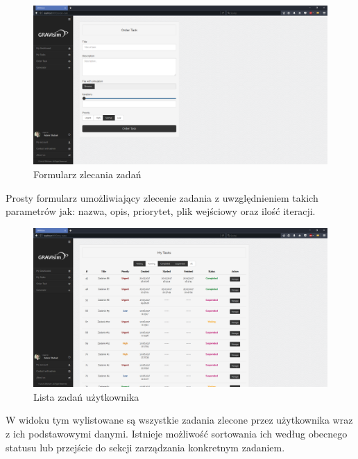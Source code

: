 \documentclass[a4paper,onecolumn,oneside,12pt]{memoir}
\begin{document}
{{\begin{figure}[h!]
	\centering
	\includegraphics[width=0.9\linewidth]{pictures/screen-4}
	\caption{Formularz zlecania zadań}
\end{figure}
Prosty formularz umożliwiający zlecenie zadania z uwzględnieniem takich parametrów jak: nazwa, opis, priorytet, plik wejściowy oraz ilość iteracji.

\begin{figure}[h!]
	\centering
	\includegraphics[width=0.9\linewidth]{pictures/screen-3}
	\caption{Lista zadań użytkownika}
\end{figure}
W widoku tym wylistowane są wszystkie zadania zlecone przez użytkownika wraz z ich podstawowymi danymi. Istnieje możliwość sortowania ich według obecnego statusu lub przejście do sekcji zarządzania konkretnym zadaniem.

}}
\end{document}
